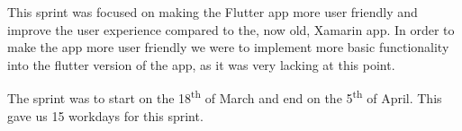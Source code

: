 This sprint was focused on making the Flutter app more user friendly and improve the user experience compared to the, now old, Xamarin app.
In order to make the app more user friendly we were to implement more basic functionality into the flutter version of the app, as it was very lacking at this point.

The sprint was to start on the 18\textsuperscript{th} of March and end on the 5\textsuperscript{th} of April. This gave us 15 workdays for this sprint.
